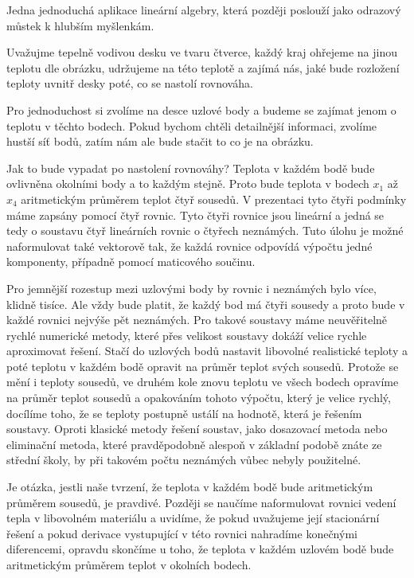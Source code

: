 \documentclass[12pt]{article}
\begin{document}
Jedna jednoduchá aplikace lineární algebry, která později poslouží jako odrazový můstek k hlubším myšlenkám.

Uvažujme tepelně vodivou desku ve tvaru čtverce, každý kraj ohřejeme na jinou teplotu dle obrázku, udržujeme na této teplotě a zajímá nás, jaké bude rozložení teploty uvnitř desky poté, co se nastolí rovnováha.

Pro jednoduchost si zvolíme na desce uzlové body a budeme se zajímat jenom o teplotu v těchto bodech. Pokud bychom chtěli detailnější informaci, zvolíme hustší síť bodů, zatím nám ale bude stačit to co je na obrázku.

Jak to bude vypadat po nastolení rovnováhy? Teplota v každém bodě bude ovlivněna okolními body a to každým stejně. Proto bude teplota v bodech $x_1$ až $x_4$ aritmetickým průměrem teplot čtyř sousedů. V prezentaci tyto čtyři podmínky máme zapsány pomocí čtyř rovnic. Tyto čtyři rovnice jsou lineární a jedná se tedy o soustavu čtyř lineárních rovnic o čtyřech neznámých. Tuto úlohu je možné naformulovat také vektorově tak, že každá rovnice odpovídá výpočtu jedné komponenty, případně pomocí maticového součinu.

Pro jemnější rozestup mezi uzlovými body by rovnic i neznámých bylo více, klidně tisíce. Ale vždy bude platit, že každý bod má čtyři sousedy a proto bude v každé rovnici nejvýše pět neznámých. Pro takové soustavy máme neuvěřitelně rychlé numerické metody, které přes velikost soustavy dokáží velice rychle aproximovat řešení. Stačí do uzlových bodů nastavit libovolné realistické teploty a poté teplotu v každém bodě opravit na průměr teplot svých sousedů. Protože se mění i teploty sousedů, ve druhém kole znovu teplotu ve všech bodech opravíme na průměr teplot sousedů a opakováním tohoto výpočtu, který je velice rychlý, docílíme toho, že se teploty postupně ustálí na hodnotě, která je řešením soustavy. Oproti klasické metody řešení soustav, jako dosazovací metoda nebo eliminační metoda, které pravděpodobně alespoň v základní podobě znáte ze střední školy, by při takovém počtu neznámých vůbec nebyly použitelné.

Je otázka, jestli naše tvrzení, že teplota v každém bodě bude aritmetickým průměrem sousedů, je pravdivé. Později se naučíme naformulovat rovnici vedení tepla v libovolném materiálu a uvidíme, že pokud uvažujeme její stacionární řešení a pokud derivace vystupující v této rovnici nahradíme konečnými diferencemi, opravdu skončíme u toho, že teplota v každém uzlovém bodě bude aritmetickým průměrem teplot v okolních bodech. 
\end{document}
